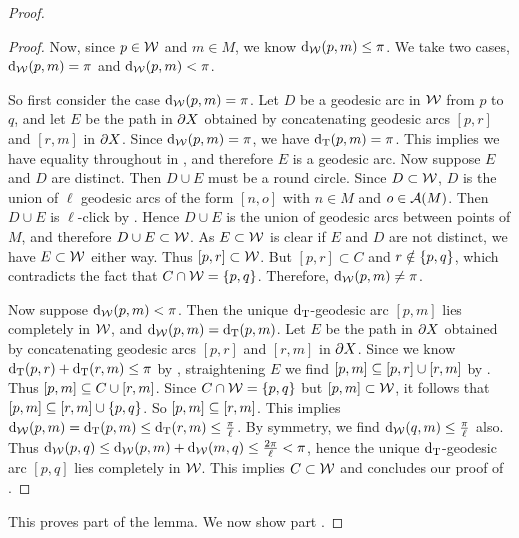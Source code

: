 \documentclass{amsart}
\DeclareMathOperator{\dW}{d_{\W}}
\begin{document}
\begin{proof}
\begin{proof}
Now, since $p \in \mathcal W$ and $m \in M$, we know $\dW(p,m) \le \pi$.
We take two cases, $\dW(p,m) = \pi$ and $\dW(p,m) < \pi$.

So first consider the case $\dW(p,m) = \pi$.
Let $D$ be a geodesic arc in $\mathcal W$ from $p$ to $q$, and let $E$ be the path in $\partial X$ obtained by concatenating geodesic arcs $[p,r]$ and $[r,m]$ in $\partial X$.
Since $\dW(p,m) = \pi$, we have $\operatorname{d_T}(p,m) = \pi$.
This implies we have equality throughout in , and therefore $E$ is a geodesic arc.
Now suppose $E$ and $D$ are distinct.
Then $D \cup E$ must be a round circle.
Since $D \subset \mathcal W$, $D$ is the union of $\ell$ geodesic arcs of the form $[n,o]$ with $n \in M$ and $o \in \operatorname{\mathcal A}(M)$.
Then $D \cup E$ is $\ell$-click by .
Hence $D \cup E$ is the union of geodesic arcs between points of $M$, and therefore $D \cup E \subset \mathcal W$.
As $E \subset \mathcal W$ is clear if $E$ and $D$ are not distinct, we have $E \subset \mathcal W$ either way.
Thus $[p,r] \subset \mathcal W$.
But $[p,r] \subset C$ and $r \notin \left\{p,q\right\}$, which contradicts the fact that $C \cap \mathcal W = \left\{p,q\right\}$.
Therefore, $\dW(p,m) \neq \pi$.

Now suppose $\dW(p,m) < \pi$.
Then the unique $\operatorname{d_T}$-geodesic arc $[p,m]$ lies completely in $\mathcal W$, and $\dW(p,m) = \dT(p,m)$.
Let $E$ be the path in $\partial X$ obtained by concatenating geodesic arcs $[p,r]$ and $[r,m]$ in $\partial X$.
Since we know $\operatorname{d_T}(p,r) + \operatorname{d_T}(r,m) \le \pi$ by , straightening $E$ we find $[p,m] \subseteq [p,r] \cup [r,m]$ by .
Thus $[p,m] \subseteq C \cup [r,m]$.
Since $C \cap \mathcal W = \left\{p,q\right\}$ but $[p,m] \subset \mathcal W$, it follows that $[p,m] \subseteq [r,m] \cup \left\{p,q\right\}$.
So $[p,m] \subseteq [r,m]$.
This implies $\dW(p,m) = \dT(p,m) \le \dT(r,m) \le \frac{\pi}{\ell}$.
By symmetry, we find $\dW(q,m) \le \frac{\pi}{\ell}$ also.
Thus $\dW(p,q) \le \dW(p,m) + \dW(m,q) \le \frac{2\pi}{\ell} < \pi$, hence the unique $\operatorname{d_T}$-geodesic arc $[p,q]$ lies completely in $\mathcal W$.
This implies $C \subset \mathcal W$ and concludes our proof of .
\end{proof}

This proves part  of the lemma.
We now show part .


\end{proof}
\end{document}
